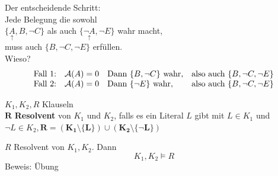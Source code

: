 \begin{bsp*}
	Der entscheidende Schritt: \\
	Jede Belegung die sowohl \\
	$\{ \underset{\uparrow}{A} ,  B , \neg C \}$ als auch $\{ \underset{\uparrow}{\neg A} , \neg E \}$ wahr macht,\\
	muss auch $\{ B , \neg C , \neg E \}$ erfüllen. \\
	Wieso?\\
	\[\begin{array}{ l l l l }
		\text{Fall 1:}	& \mathcal{A}( A ) = 0	& \text{Dann } \{ B , \neg C \} \text{ wahr,}	& \text{also auch } \{ B , \neg C , \neg E \}	\\
		\text{Fall 2:}	& \mathcal{A}( A ) = 0	& \text{Dann } \{ \neg E \} \text{ wahr,}		& \text{also auch } \{ B , \neg C , \neg E \}	
	\end{array}\]
\end{bsp*}
\begin{def*}[note = Resolvent , index = Resolvent]
	$K_1 , K_2 , R$ Klauseln \\
	$\mathbf{R}$ \textbf{Resolvent} von $K_1$ und $K_2$, falls es ein Literal $L$ gibt mit $L \in K_1$ und $\neg L \in K_2 , \mathbf{R=( K_1 \setminus \{ L \} ) \cup ( K_2 \setminus \{ \neg L \} )}$
\end{def*}
\begin{satz*}
	$R$ Resolvent von $K_1 , K_2$. Dann
	\[K_1 , K_2 \models R\]
	Beweis: Übung
\end{satz*}
